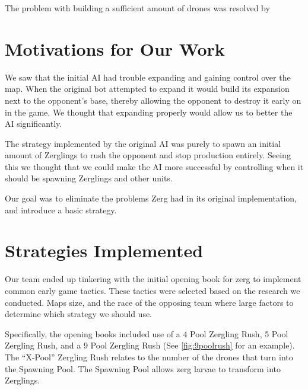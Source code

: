 \documentclass{article}
\begin{document}
The problem with building a sufficient amount of drones was resolved by %

\section{Motivations for Our Work}

We saw that the initial AI had trouble expanding and gaining control over the map. When the original bot attempted to expand it would build its expansion next to the opponent's base, thereby allowing the opponent to destroy it early on in the game. We thought that expanding properly would allow us to better the AI significantly.

The strategy implemented by the original AI was purely to spawn an initial amount of Zerglings to rush the opponent and stop production entirely. Seeing this we thought that we could make the AI more successful by controlling when it should be spawning Zerglings and other units. 

Our goal was to eliminate the problems Zerg had in its original implementation, and introduce a basic strategy.  

\section{Strategies Implemented}

Our team ended up tinkering with the initial opening book for zerg to implement common early game tactics. These tactics were selected based on the research we conducted. Maps size, and the race of the opposing team where large factors to determine which strategy we should use.

Specifically, the opening books included use of a 4 Pool Zergling Rush, 5 Pool Zergling Rush, and a 9 Pool Zergling Rush (See \autoref{fig:9poolrush} for an example). The ``X-Pool'' Zergling Rush relates to the number of the drones that turn into the Spawning Pool. The Spawning Pool allows zerg larvae to transform into Zerglings.
\end{document}
